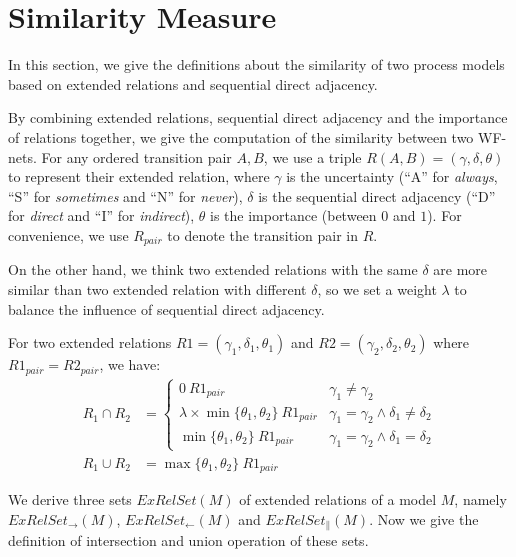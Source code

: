 \documentclass{llncs}
\begin{document}
\section{Similarity Measure}\label{sec:similarity}
In this section, we give the definitions about the similarity of two process models based on extended relations and sequential direct adjacency.

By combining extended relations, sequential direct adjacency and the importance of relations together, we give the computation of the similarity between two WF-nets. For any ordered transition pair $A,B$, we use a triple $R(A,B)=(\gamma,\delta,\theta)$ to represent their extended relation, where $\gamma$ is the uncertainty (``A'' for \textit{always}, ``S'' for \textit{sometimes} and ``N'' for \textit{never}), $\delta$ is the sequential direct adjacency (``D'' for \textit{direct} and ``I'' for \textit{indirect}), $\theta$ is the importance (between $0$ and $1$). For convenience, we use $R_{pair}$ to denote the transition pair in $R$.

On the other hand, we think two extended relations with the same $\delta$ are more similar than two extended relation with different $\delta$, so we set a weight $\lambda$ to balance the influence of sequential direct adjacency.

For two extended relations $R1=(\gamma_{1},\delta_{1},\theta_{1})$ and $R2=(\gamma_{2},\delta_{2},\theta_{2})$ where $R1_{pair}=R2_{pair}$, we have:
\begin{equation}\label{eq:relationOperations}
	\begin{aligned}
		R_{1}\cap R_{2}&=
			\begin{cases}
				0~R1_{pair}&	\gamma_{1}\neq\gamma_{2}\\
				\lambda\times\min\{\theta_{1},\theta_{2}\}~R1_{pair}&	\gamma_{1}=\gamma_{2}\wedge\delta_{1}\neq\delta_{2}\\
				\min\{\theta_{1},\theta_{2}\}~R1_{pair}&	\gamma_{1}=\gamma_{2}\wedge\delta_{1}=\delta_{2}
			\end{cases}\\
		R_{1}\cup R_{2}&=	\max\{\theta_{1},\theta_{2}\}~R1_{pair}
	\end{aligned}
\end{equation}

We derive three sets $ExRelSet(M)$ of extended relations of a model $M$, namely $ExRelSet_{\rightarrow}(M)$, $ExRelSet_{\leftarrow }(M)$ and $ExRelSet_{\parallel}(M)$. Now we give the definition of intersection and union operation of these sets.
\end{document}
